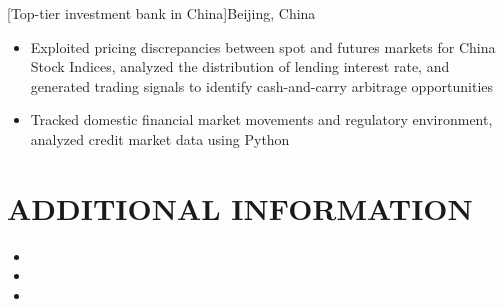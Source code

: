 \documentclass[cmu]{resume}
\begin{document}
    [Top-tier investment bank in China]{Beijing, China}
    \begin{itemize}
        \item Exploited pricing discrepancies between spot and futures markets for China Stock Indices, analyzed the distribution of lending interest rate, and generated trading signals to identify cash-and-carry arbitrage opportunities
        \item Tracked domestic financial market movements and regulatory environment, analyzed credit market data using Python
    \end{itemize}

    \section{ADDITIONAL INFORMATION}
    \begin{itemize}
        \item {}
        \item {}
        \item {}
    \end{itemize}
\end{document}
